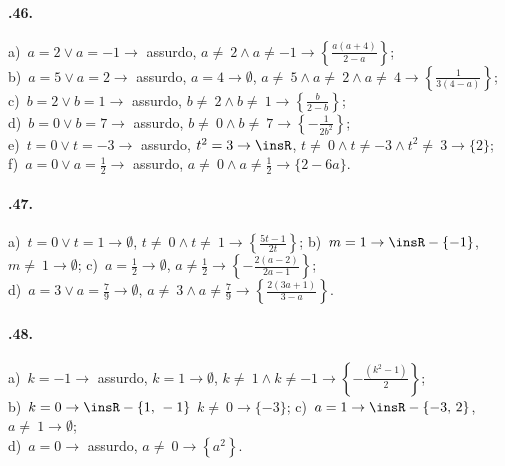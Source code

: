 \paragraph{\thechapter.46.}
a)~$a=2\vee a=-1 \rightarrow$ assurdo, $a\neq~2\wedge a\neq -1 \rightarrow \left\{\frac{a(a+4)}{2-a}\right\}$;
\protect\\ b)~$a=5\vee a=2 \rightarrow$ assurdo, $a=4 \rightarrow \emptyset$, $a\neq~5\wedge a\neq~2\wedge a\neq~4 \rightarrow \left\{\frac{1}{3(4-a)}\right\}$;
\protect\\ c)~$b=2\vee b=1 \rightarrow$ assurdo, $b\neq~2\wedge b\neq~1 \rightarrow \left\{\frac{b}{2-b}\right\}$;
\protect\\ d)~$b=0\vee b=7\rightarrow$ assurdo, $b\neq~0\wedge b\neq~7 \rightarrow \left\{-{\frac{1}{2b^{2}}}\right\}$;
\protect\\ e)~$t=0\vee t=-3 \rightarrow$ assurdo, $t^{2}=3 \rightarrow \insR$, $t\neq~0\wedge t\neq -3\wedge t^{2}\neq~3 \rightarrow \{2\}$;
\protect\\ f)~$a=0\vee a=\frac{1}{2} \rightarrow$ assurdo, $a\neq~0\wedge a\neq \frac{1}{2} \rightarrow \{2-6a\}$.

\paragraph{\thechapter.47.}
a)~$t=0\vee t=1 \rightarrow \emptyset$, $t\neq~0\wedge t\neq~1 \rightarrow \left\{\frac{5t-1}{2t}\right\}$;
\quad b)~$m=1 \rightarrow \insR-\{-1\}$, $m\neq~1 \rightarrow \emptyset$;
\quad c)~$a=\frac{1}{2} \rightarrow \emptyset$, $a\neq \frac{1}{2} \rightarrow \left\{-{\frac{2(a-2)}{2a-1}}\right\}$;
\protect\\ d)~$a=3\vee a=\frac{7}{9} \rightarrow \emptyset$, $a\neq~3\wedge a\neq \frac{7}{9} \rightarrow \left\{\frac{2(3a+1)}{3-a}\right\}$.

\paragraph{\thechapter.48.}
a)~$k=-1 \rightarrow$ assurdo, $k=1 \rightarrow \emptyset$, $k\neq~1\wedge k\neq -1 \rightarrow \left\{-{\frac{\left(k^2-1\right)}{2}}\right\}$;
\protect\\ b)~$k=0 \rightarrow \insR-\{1\text{,~}-1\}$ $k\neq~0 \rightarrow \{-3\}$; c)~$a=1 \rightarrow \insR-\{-3\text{,~}2\}$, $a\neq~1 \rightarrow \emptyset$;
\protect\\ d)~$a=0 \rightarrow$ assurdo, $a\neq~0 \rightarrow \left\{a^{2}\right\}$.

